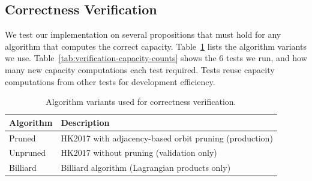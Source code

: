 %
%
%
%

\subsection{Correctness Verification}
\label{sec:correctness}

We test our implementation on several propositions that must hold for any
algorithm that computes the correct capacity.
Table~\ref{tab:correctness-algorithms} lists the algorithm variants we use.
Table~\ref{tab:verification-capacity-counts} shows the 6 tests we run, and
how many new capacity computations each test required. Tests reuse capacity
computations from other tests for development efficiency.

\begin{table}[h]
\centering
\begin{tabular}{ll}
\toprule
Algorithm & Description \\
\midrule
Pruned & HK2017 with adjacency-based orbit pruning (production) \\
Unpruned & HK2017 without pruning (validation only) \\
Billiard & Billiard algorithm (Lagrangian products only) \\
\bottomrule
\end{tabular}
\caption{Algorithm variants used for correctness verification.}
\label{tab:correctness-algorithms}
\end{table}

